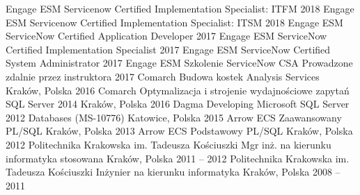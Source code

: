 \begin{cventries}
	\cventry
		{Engage ESM}
		{Servicenow Certified Implementation Specialist: ITFM}
		{}
		{2018}
		{}
	\cventry
		{Engage ESM}
		{Servicenow Certified Implementation Specialist: ITSM}
		{}
		{2018}
		{}
	\cventry
		{Engage ESM}
		{ServiceNow Certified Application Developer}
		{}
		{2017}
		{}
	\cventry
		{Engage ESM}
		{ServiceNow Certified Implementation Specialist}
		{}
		{2017}
		{}
	\cventry
		{Engage ESM}
		{ServiceNow Certified System Administrator}
		{}
		{2017}
		{}
	\cventry
		{Engage ESM}
		{Szkolenie ServiceNow CSA}
		{Prowadzone zdalnie przez instruktora}
		{2017}
		{}
	\cventry
		{Comarch}
		{Budowa kostek Analysis Services}
		{Kraków, Polska}
		{2016}
		{}
	\cventry
		{Comarch}
		{Optymalizacja i strojenie wydajnościowe zapytań SQL Server 2014}
		{Kraków, Polska}
		{2016}
		{}
	\cventry
		{Dagma}
		{Developing Microsoft SQL Server 2012 Databases (MS-10776)}
		{Katowice, Polska}
		{2015}
		{}
	\cventry
		{Arrow ECS}
		{Zaawansowany PL/SQL}
		{Kraków, Polska}
		{2013}
		{}
	\cventry
		{Arrow ECS}
		{Podstawowy PL/SQL}
		{Kraków, Polska}
		{2012}
		{}
	\cventry
		{Politechnika Krakowska im. Tadeusza Kościuszki}
		{Mgr inż. na kierunku informatyka stosowana}
		{Kraków, Polska} 
		{2011 -- 2012}
		{}
	\cventry
		{Politechnika Krakowska im. Tadeusza Kościuszki}
		{Inżynier na kierunku informatyka}
		{Kraków, Polska}
		{2008 -- 2011} 
		{}
\end{cventries}
